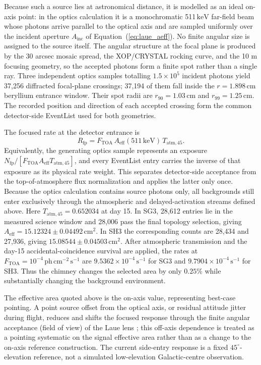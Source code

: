 \documentclass[11pt]{article}
\newcommand{\keV}{\ensuremath{\,\mathrm{keV}}}
\newcommand{\phcms}{\ensuremath{\,\mathrm{ph\,cm^{-2}\,s^{-1}}}}
\newcommand{\cps}{\ensuremath{\,\mathrm{s^{-1}}}}
\newcommand{\aeff}{A_{\mathrm{eff}}}
\begin{document}
Because such a source lies at astronomical distance, it is modelled as an ideal
on-axis point: in the optics calculation it is a monochromatic 511\keV{}
far-field beam whose photons arrive parallel to the optical axis and are sampled
uniformly over the incident aperture $A_{\mathrm{inc}}$ of
Equation~(\ref{eq:laue_aeff}). No finite angular size is assigned to the source
itself. The angular structure at the focal plane is produced by the 30 arcsec
mosaic spread, the XOP/CRYSTAL rocking curve, and the 10 m focusing geometry, so
the accepted photons form a finite spot rather than a single ray. Three
independent optics samples totalling $1.5\times10^5$ incident photons yield 37,256
diffracted focal-plane crossings; 37,194 of them fall inside the
$r=1.898\,\mathrm{cm}$ beryllium entrance window. Their spot radii are
$r_{90}=1.03\,\mathrm{cm}$ and $r_{99}=1.25\,\mathrm{cm}$. The recorded position
and direction of each accepted crossing form the common detector-side EventList
used for both geometries.

The focused rate at the detector entrance is
\begin{equation}
  R_{\mathrm{fp}}=F_{\mathrm{TOA}}\,\aeff(511\keV)\,T_{\mathrm{atm},45}.
\end{equation}
Equivalently, the generating optics sample represents an exposure
$N_{\mathrm{fp}}/[F_{\mathrm{TOA}}\aeff T_{\mathrm{atm},45}]$, and every
EventList entry carries the inverse of that exposure as its physical rate
weight. This separates detector-side acceptance from the top-of-atmosphere flux
normalization and applies the latter only once. Because the optics calculation
contains source photons only, all backgrounds still enter exclusively through
the atmospheric and delayed-activation streams defined above.
Here $T_{\mathrm{atm},45}=0.652034$ at day 15. In SG3, 28,612 entries lie in the
measured science window and 28,006 pass the final topology selection, giving
$A_{\mathrm{eff}}=15.12324\pm0.04492\,\mathrm{cm^2}$. In SH3 the corresponding
counts are 28,434 and 27,936, giving
$15.08544\pm0.04503\,\mathrm{cm^2}$. After atmospheric transmission and the
day-15 accidental-coincidence survival are applied, the rates at
$F_{\mathrm{TOA}}=10^{-4}\phcms$ are $9.5362\times10^{-4}\cps$ for SG3 and
$9.7904\times10^{-4}\cps$ for SH3. Thus the chimney changes the selected area by
only $0.25\%$ while substantially changing the background environment.

The effective area quoted above is the on-axis value, representing best-case
pointing. A point source offset from the optical axis, or residual attitude
jitter during flight, reduces and shifts the focused response through the finite
angular acceptance (field of view) of the Laue lens
\cite{Barriere2009Laue,Weidenspointner2006MAX}; this off-axis dependence is
treated as a pointing systematic on the signal effective area rather than as a
change to the on-axis reference construction. The current side-entry response
is a fixed $45^\circ$-elevation reference, not a simulated
low-elevation Galactic-centre observation.
\end{document}
